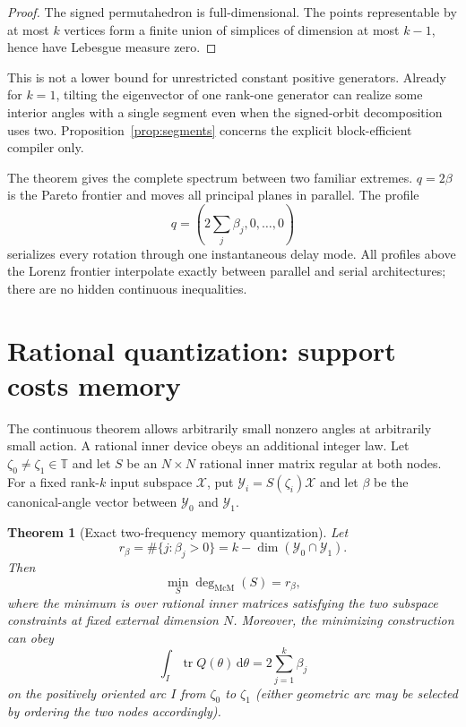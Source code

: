 \documentclass[11pt]{article}
\newtheorem{theorem}{Theorem}[section]
\theoremstyle{definition}
\theoremstyle{remark}
\newcommand{\T}{\mathbb T}
\newcommand{\tr}{\operatorname{tr}}
\newcommand{\dd}{\mathrm d}
\newcommand{\mcdeg}{\deg_{\mathrm{McM}}}
\begin{document}
\begin{proof}
The signed permutahedron is full-dimensional.  The points representable by at
most $k$ vertices form a finite union of simplices of dimension at most
$k-1$, hence have Lebesgue measure zero.
\end{proof}

This is not a lower bound for unrestricted constant positive generators.
Already for $k=1$, tilting the eigenvector of one rank-one generator can
realize some interior angles with a single segment even when the signed-orbit
decomposition uses two.  Proposition~\ref{prop:segments} concerns the explicit
block-efficient compiler only.

The theorem gives the complete spectrum between two familiar extremes.
$q=2\beta$ is the Pareto frontier and moves all principal planes in parallel.
The profile
\begin{equation}\label{eq:serial}
 q=(2\sum_j\beta_j,0,\ldots,0)
\end{equation}
serializes every rotation through one instantaneous delay mode.  All profiles
above the Lorenz frontier interpolate exactly between parallel and serial
architectures; there are no hidden continuous inequalities.

\section{Rational quantization: support costs memory}

The continuous theorem allows arbitrarily small nonzero angles at arbitrarily
small action.  A rational inner device obeys an additional integer law.
Let $\zeta_0\ne\zeta_1\in\T$ and let $S$ be an $N\times N$ rational inner
matrix regular at both nodes.  For a fixed rank-$k$ input subspace
$\mathcal X$, put $\mathcal Y_i=S(\zeta_i)\mathcal X$ and let $\beta$ be the
canonical-angle vector between $\mathcal Y_0$ and $\mathcal Y_1$.

\begin{theorem}[Exact two-frequency memory quantization]\label{thm:quantization}
Let
\begin{equation}\label{eq:rbeta}
 r_\beta=\#\{j:\beta_j>0\}
 =k-\dim(\mathcal Y_0\cap\mathcal Y_1).
\end{equation}
Then
\begin{equation}\label{eq:minimaldegree}
 \boxed{\qquad
 \min_S\mcdeg(S)=r_\beta,
 \qquad}
\end{equation}
where the minimum is over rational inner matrices satisfying the two
subspace constraints at fixed external dimension $N$.  Moreover, the
minimizing construction can obey
\begin{equation}\label{eq:localactionsaturation}
 \int_I\tr Q(\theta)\,\dd\theta=2\sum_{j=1}^k\beta_j
\end{equation}
on the positively oriented arc $I$ from $\zeta_0$ to $\zeta_1$ (either
geometric arc may be selected by ordering the two nodes accordingly).
\end{theorem}
\end{document}

